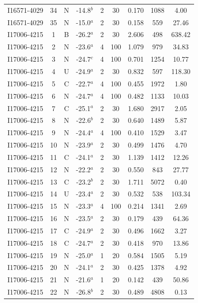 \begin{table}
\begin{tabular}{ccccccccc}
I16571-4029 & 34 & N & -14.8$^{b}$ & 2 & 30 & 0.170 & 1088 & 4.00 \\
I16571-4029 & 35 & N & -15.0$^{a}$ & 2 & 30 & 0.158 & 559 & 27.46 \\
I17006-4215 & 1 & B & -26.2$^{a}$ & 2 & 30 & 2.606 & 498 & 638.42 \\
I17006-4215 & 2 & N & -23.6$^{a}$ & 4 & 100 & 1.079 & 979 & 34.83 \\
I17006-4215 & 3 & N & -24.7$^{c}$ & 4 & 100 & 0.701 & 1254 & 10.77 \\
I17006-4215 & 4 & U & -24.9$^{a}$ & 2 & 30 & 0.832 & 597 & 118.30 \\
I17006-4215 & 5 & C & -22.7$^{a}$ & 4 & 100 & 0.455 & 1972 & 1.80 \\
I17006-4215 & 6 & N & -24.7$^{a}$ & 4 & 100 & 0.482 & 1133 & 10.03 \\
I17006-4215 & 7 & C & -25.1$^{a}$ & 2 & 30 & 1.680 & 2917 & 2.05 \\
I17006-4215 & 8 & N & -22.6$^{b}$ & 2 & 30 & 0.640 & 1489 & 5.87 \\
I17006-4215 & 9 & N & -24.4$^{a}$ & 4 & 100 & 0.410 & 1529 & 3.47 \\
I17006-4215 & 10 & N & -23.9$^{a}$ & 2 & 30 & 0.499 & 1476 & 4.70 \\
I17006-4215 & 11 & C & -24.1$^{a}$ & 2 & 30 & 1.139 & 1412 & 12.26 \\
I17006-4215 & 12 & N & -22.2$^{a}$ & 2 & 30 & 0.550 & 843 & 27.77 \\
I17006-4215 & 13 & C & -23.2$^{b}$ & 2 & 30 & 1.711 & 5072 & 0.40 \\
I17006-4215 & 14 & U & -23.4$^{a}$ & 2 & 30 & 0.532 & 538 & 103.34 \\
I17006-4215 & 15 & N & -23.3$^{a}$ & 4 & 100 & 0.214 & 1341 & 2.69 \\
I17006-4215 & 16 & N & -23.5$^{a}$ & 2 & 30 & 0.179 & 439 & 64.36 \\
I17006-4215 & 17 & C & -24.9$^{a}$ & 2 & 30 & 0.496 & 1662 & 3.27 \\
I17006-4215 & 18 & C & -24.7$^{a}$ & 2 & 30 & 0.418 & 970 & 13.86 \\
I17006-4215 & 19 & N & -25.0$^{a}$ & 1 & 20 & 0.584 & 1505 & 5.19 \\
I17006-4215 & 20 & N & -24.1$^{a}$ & 2 & 30 & 0.425 & 1378 & 4.92 \\
I17006-4215 & 21 & N & -21.6$^{a}$ & 1 & 20 & 0.142 & 439 & 50.86 \\
I17006-4215 & 22 & N & -26.8$^{b}$ & 2 & 30 & 0.489 & 4808 & 0.13 \\

\end{tabular}
\end{table}
